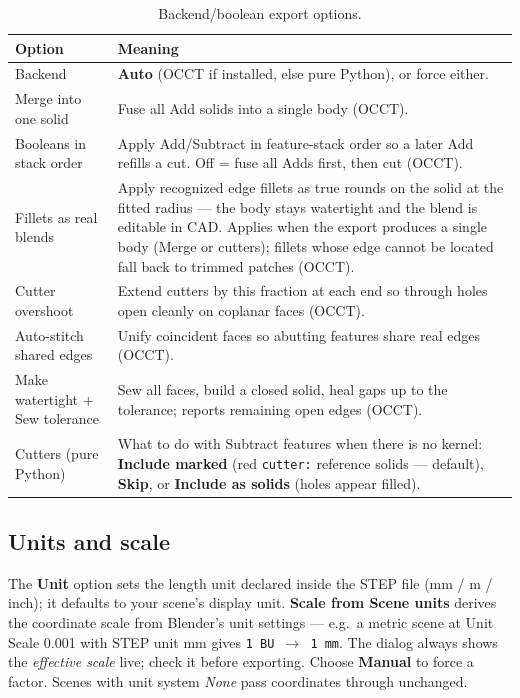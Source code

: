 \documentclass[11pt,a4paper]{article}
\newcommand{\ui}[1]{\textsf{\textbf{#1}}}   %
\begin{document}
\begin{table}[h]
\centering
\small
\begin{tabular}{@{}p{4.2cm}p{9.6cm}@{}}
\toprule
\textbf{Option} & \textbf{Meaning} \\
\midrule
Backend & \ui{Auto} (OCCT if installed, else pure Python), or force either. \\
Merge into one solid & Fuse all Add solids into a single body (OCCT). \\
Booleans in stack order & Apply Add/Subtract in feature-stack order so a
  later Add refills a cut. Off = fuse all Adds first, then cut (OCCT). \\
Fillets as real blends & Apply recognized edge fillets as true rounds on the
  solid at the fitted radius — the body stays watertight and the blend is
  editable in CAD. Applies when the export produces a single body (Merge or
  cutters); fillets whose edge cannot be located fall back to trimmed
  patches (OCCT). \\
Cutter overshoot & Extend cutters by this fraction at each end so through
  holes open cleanly on coplanar faces (OCCT). \\
Auto-stitch shared edges & Unify coincident faces so abutting features share
  real edges (OCCT). \\
Make watertight + Sew tolerance & Sew all faces, build a closed solid, heal
  gaps up to the tolerance; reports remaining open edges (OCCT). \\
Cutters (pure Python) & What to do with Subtract features when there is no
  kernel: \ui{Include marked} (red \texttt{cutter:} reference solids ---
  default), \ui{Skip}, or \ui{Include as solids} (holes appear filled). \\
\bottomrule
\end{tabular}
\caption{Backend/boolean export options.}
\end{table}

\subsection{Units and scale}
\label{sec:units}

The \ui{Unit} option sets the length unit declared inside the STEP file
(mm / m / inch); it defaults to your scene's display unit. \ui{Scale from
Scene units} derives the coordinate scale from Blender's unit settings ---
e.g.\ a metric scene at Unit Scale 0.001 with STEP unit mm gives
\texttt{1 BU $\to$ 1 mm}. The dialog always shows the \emph{effective scale}
live; check it before exporting. Choose \ui{Manual} to force a factor.
Scenes with unit system \emph{None} pass coordinates through unchanged.
\end{document}
